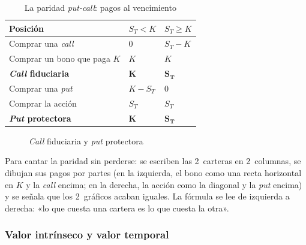 \documentclass[11pt]{article}
\begin{document}
\begin{table}[H]
\centering
\caption{La paridad \emph{put-call}: pagos al vencimiento}\label{tab:put-call}
\begin{tabular}{>{\raggedright\arraybackslash}m{5.4cm}>{\centering\arraybackslash}m{3.2cm}>{\centering\arraybackslash}m{3.2cm}}
\toprule
\rowcolor{tceeazulpalido}\textbf{Posición} & $S_T<K$ & $S_T\geq K$\\
\midrule
Comprar una \emph{call} & $0$ & $S_T-K$\\
Comprar un bono que paga $K$ & $K$ & $K$\\
\rowcolor{tceesalvia}\textbf{\emph{Call} fiduciaria} & $\boldsymbol{K}$ & $\boldsymbol{S_T}$\\
\midrule
Comprar una \emph{put} & $K-S_T$ & $0$\\
Comprar la acción & $S_T$ & $S_T$\\
\rowcolor{tceesalvia}\textbf{\emph{Put} protectora} & $\boldsymbol{K}$ & $\boldsymbol{S_T}$\\
\bottomrule
\end{tabular}
\end{table}

\begin{figure}[H]
\centering
\caption{\emph{Call} fiduciaria y \emph{put} protectora}\label{fig:paridad-put-call}
\end{figure}

\begin{notaopositor}
Para cantar la paridad sin perderse: se escriben las 2~carteras en 2~columnas, se dibujan sus pagos por partes (en la izquierda, el bono como una recta horizontal en $K$ y la \emph{call} encima; en la derecha, la acción como la diagonal y la \emph{put} encima) y se señala que los 2~gráficos acaban iguales. La fórmula se lee de izquierda a derecha: «lo que cuesta una cartera es lo que cuesta la otra».
\end{notaopositor}

\subsubsection{Valor intrínseco y valor temporal}\label{sec:valor-temporal}
\end{document}
